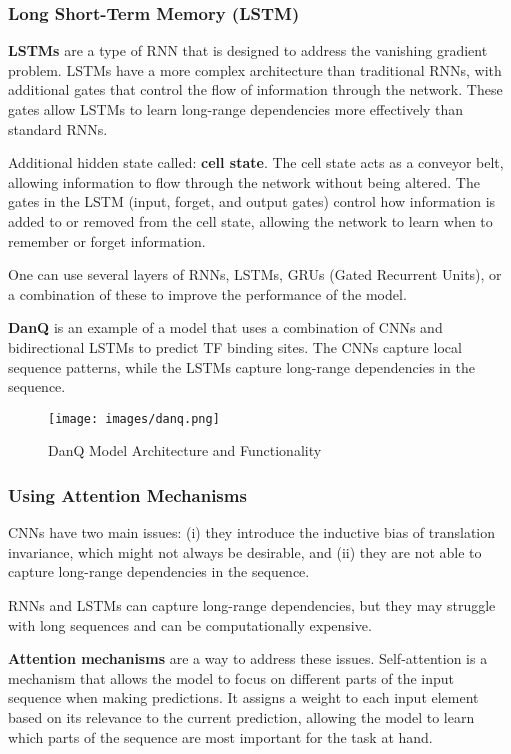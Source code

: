 \documentclass[a4paper]{article}
\begin{document}
\subsubsection*{Long Short-Term Memory (LSTM)}

\textbf{LSTMs} are a type of RNN that is designed to
address the vanishing gradient problem. LSTMs have a more complex architecture than
traditional RNNs, with additional gates that control the flow of information through
the network. These gates allow LSTMs to learn long-range dependencies more effectively
than standard RNNs.

Additional hidden state called: \textbf{cell state}. The cell state acts as a conveyor
belt, allowing information to flow through the network without being altered. The gates
in the LSTM (input, forget, and output gates) control how information is added to or
removed from the cell state, allowing the network to learn when to remember or forget
information.

One can use several layers of RNNs, LSTMs, GRUs (Gated Recurrent Units), or a combination
of these to improve the performance of the model.

\textbf{DanQ} is an example of a model that uses a combination of CNNs and bidirectional
LSTMs to predict TF binding sites. The CNNs capture local sequence patterns, while the
LSTMs capture long-range dependencies in the sequence.

\begin{figure}[H]
  \centering
  \texttt{[image: images/danq.png]}
  \caption{DanQ Model Architecture and Functionality}
\end{figure}


\subsubsection*{Using Attention Mechanisms}

CNNs have two main issues: (i) they introduce the inductive bias of translation
invariance, which might not always be desirable, and (ii) they are not able to
capture long-range dependencies in the sequence.

RNNs and LSTMs can capture long-range dependencies, but they may struggle with
long sequences and can be computationally expensive.

\textbf{Attention mechanisms} are a way to address these issues. Self-attention
is a mechanism that allows the model to focus on different parts of the input
sequence when making predictions. It assigns a weight to each input element
based on its relevance to the current prediction, allowing the model to learn
which parts of the sequence are most important for the task at hand.
\end{document}
